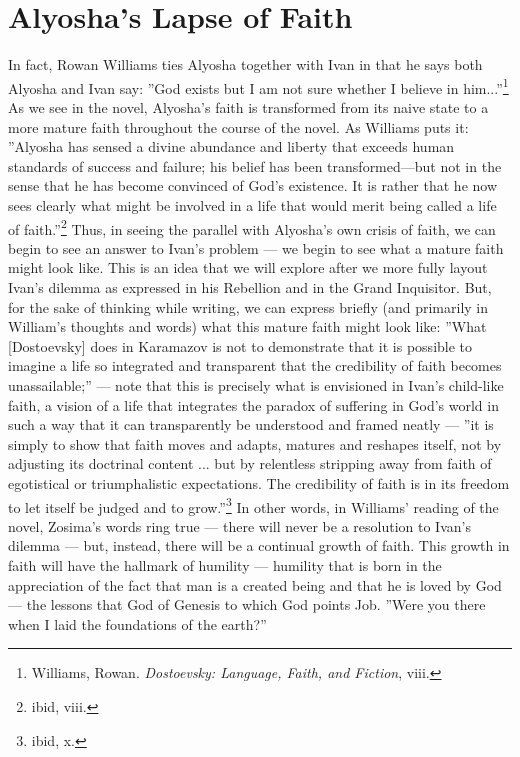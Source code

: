 	\section{Alyosha's Lapse of Faith}
	
In fact, Rowan Williams ties Alyosha together with Ivan in that he says both Alyosha and Ivan say: ''God exists but I am not sure whether I believe in him...''\footnote{Williams, Rowan. \emph{Dostoevsky: Language, Faith, and Fiction}, viii.} As we see in the novel, Alyosha's faith is transformed from its naive state to a more mature faith throughout the course of the novel. As Williams puts it: ''Alyosha has sensed a divine abundance and liberty that exceeds human standards of success and failure; his belief has been transformed---but not in the sense that he has become convinced of God's existence. It is rather that he now sees clearly what might be involved in a life that would merit being called a life of faith.''\footnote{ibid, viii.} Thus, in seeing the parallel with Alyosha's own crisis of faith, we can begin to see an answer to Ivan's problem --- we begin to see what a mature faith might look like. This is an idea that we will explore after we more fully layout Ivan's dilemma as expressed in his Rebellion and in the Grand Inquisitor. But, for the sake of thinking while writing, we can express briefly (and primarily in William's thoughts and words) what this mature faith might look like: ''What [Dostoevsky] does in Karamazov is not to demonstrate that it is possible to imagine a life so integrated and transparent that the credibility of faith becomes unassailable;'' --- note that this is precisely what is envisioned in Ivan's child-like faith, a vision of a life that integrates the paradox of suffering in God's world in such a way that it can transparently be understood and framed neatly --- ''it is simply to show that faith moves and adapts, matures and reshapes itself, not by adjusting its doctrinal content ... but by relentless stripping away from faith of egotistical or triumphalistic expectations. The credibility of faith is in its freedom to let itself be judged and to grow.''\footnote{ibid, x.} In other words, in Williams' reading of the novel, Zosima's words ring true --- there will never be a resolution to Ivan's dilemma --- but, instead, there will be a continual growth of faith. This growth in faith will have the hallmark of humility --- humility that is born in the appreciation of the fact that man is a created being and that he is loved by God --- the lessons that God of Genesis to which God points Job. ''Were you there when I laid the foundations of the earth?''

